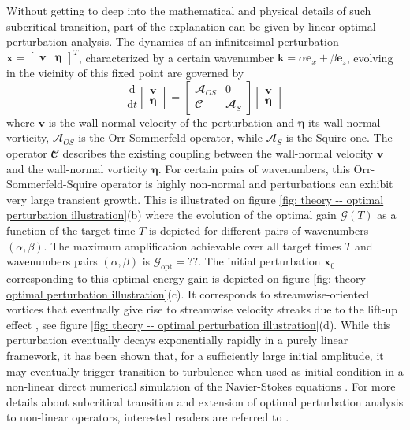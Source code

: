       Without getting to deep into the mathematical and physical details of such subcritical transition, part of the explanation can be given by linear optimal perturbation analysis. The dynamics of an infinitesimal perturbation $\mathbf{x} = \begin{bmatrix} \mathbf{v} & \mathbf{\eta} \end{bmatrix}^T$, characterized by a certain wavenumber $\mathbf{k} = \alpha \mathbf{e}_x + \beta \mathbf{e}_z$, evolving in the vicinity of this fixed point are governed by
      \begin{equation}
        \displaystyle \frac{\mathrm{d}}{\mathrm{d}t} \begin{bmatrix} \mathbf{v} \\ \mathbf{\eta} \end{bmatrix} = \begin{bmatrix} \mathbfcal{A}_{OS} & 0 \\ \mathbfcal{C} & \mathbfcal{A}_{S} \end{bmatrix} \begin{bmatrix} \mathbf{v} \\ \mathbf{\eta} \end{bmatrix}
        \label{eq: theory -- orr-sommerfeld-squire equations}
      \end{equation}
      where $\mathbf{v}$ is the wall-normal velocity of the perturbation and $\mathbf{\eta}$ its wall-normal vorticity, $\mathbfcal{A}_{OS}$ is the Orr-Sommerfeld operator, while $\mathbfcal{A}_{S}$ is the Squire one. The operator $\mathbfcal{C}$ describes the existing coupling between the wall-normal velocity $\mathbf{v}$ and the wall-normal vorticity $\mathbf{\eta}$. For certain pairs of wavenumbers, this Orr-Sommerfeld-Squire operator is highly non-normal and perturbations can exhibit very large transient growth. This is illustrated on figure \ref{fig: theory -- optimal perturbation illustration}(b) where the evolution of the optimal gain $\mathcal{G}(T)$ as a function of the target time $T$ is depicted for different pairs of wavenumbers $(\alpha, \beta)$. The maximum amplification achievable over all target times $T$ and wavenumbers pairs $(\alpha, \beta)$ is $\mathcal{G}_{\mathrm{opt}} = ??$. The initial perturbation $\mathbf{x}_0$ corresponding to this optimal energy gain is depicted on figure \ref{fig: theory -- optimal perturbation illustration}(c). It corresponds to streamwise-oriented vortices that eventually give rise to streamwise velocity streaks due to the lift-up effect \cite{}, see figure \ref{fig: theory -- optimal perturbation illustration}(d). While this perturbation eventually decays exponentially rapidly in a purely linear framework, it has been shown that, for a sufficiently large initial amplitude, it may eventually trigger transition to turbulence when used as initial condition in a non-linear direct numerical simulation of the Navier-Stokes equations \cite{??}. For more details about subcritical transition and extension of optimal perturbation analysis to non-linear operators, interested readers are referred to \cite{??}.

